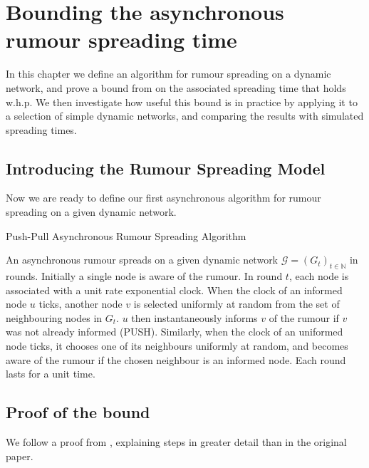 \chapter{Bounding the asynchronous rumour spreading time}
\label{chapter:AsyncUpperBound}

In this chapter we define an algorithm for rumour spreading on a dynamic network, and prove a bound from \cite{asyncPaper} on the associated spreading time that holds w.h.p. We then investigate how useful this bound is in practice by applying it to a selection of simple dynamic networks, and comparing the results with simulated spreading times. 

\section{Introducing the Rumour Spreading Model}
Now we are ready to define our first asynchronous algorithm for rumour spreading on a given dynamic network.

\begin{definition}
	Push-Pull Asynchronous Rumour Spreading Algorithm 
\end{definition}
\label{NodeCentricAsyncAlgorithm}

\noindent
An asynchronous rumour spreads on a given dynamic network $\mathcal{G} = (G_t)_{t\in \mathbb{N}}$ in rounds. Initially a single node is aware of the rumour. In round $t$, each node is associated with a unit rate exponential clock. When the clock of an informed node $u$ ticks, another node $v$ is selected uniformly at random from the set of neighbouring nodes in $G_t$. $u$ then instantaneously informs $v$ of the rumour if $v$ was not already informed (PUSH). Similarly, when the clock of an uniformed node ticks, it chooses one of its neighbours uniformly at random, and becomes aware of the rumour if the chosen neighbour is an informed node. Each round lasts for a unit time. %




\section{Proof of the bound}

We follow a proof from \cite{asyncPaper}, explaining steps in greater detail than in the original paper.


